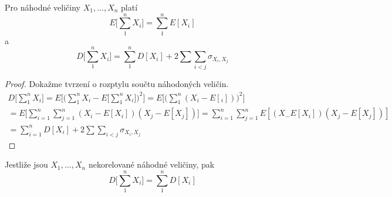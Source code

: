 \begin{theorem}
Pro náhodné veličiny $X_1, ..., X_n$ platí
\begin{equation*}
E\Big[\sum_1^n X_i \Big] = \sum_1^n E[X_i]
\end{equation*}
a
\begin{equation*}
D\Big[\sum_1^n X_i \Big] = \sum_1^n D[X_i] + 2 \sum \sum_{i < j} \sigma_{X_i, X_j}
\end{equation*}
\end{theorem}

\begin{proof}
Dokažme tvrzení o rozptylu součtu náhodoných veličin.
\begin{gather*}
D\Big[\sum_1^n X_i \Big] = E \Big[\Big(\sum_1^n X_i - E\Big[\sum_1^n X_i\Big] \Big)^2 \Big] = E\Big[\Big(\sum_1^n(X_i - E[_i]) \Big)^2 \Big]\\
= E \Big[\sum_{i = 1}^n \sum_{j = 1}^n (X_i - E[X_i])(X_j - E[X_j]) \Big] = \sum_{i = 1}^n \sum_{j = 1}^nE[(X_ - E[X_i])(X_j - E[X_j])]\\
= \sum_{i = 1}^n D[X_i] + 2 \sum \sum_{i < j} \sigma_{X_i, X_j}
\end{gather*}
\end{proof}

\begin{corollary}
Jestliže jsou $X_1, ..., X_n$ nekorelované náhodné veličiny, pak
\begin{equation*}
D\Big[\sum_1^n X_i  \Big] = \sum_1^n D[X_i]
\end{equation*}
\end{corollary}
